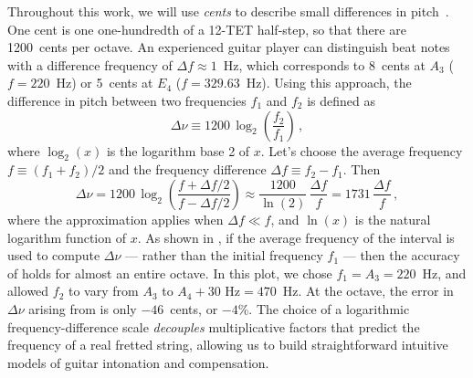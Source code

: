 Throughout this work, we will use \emph{cents} to describe small differences in pitch~\cite{ref:hall1985see,ref:hall1988anl,ref:krantz2000cie,ref:jedrzejewski2008gds,ref:varieschi2010icf,ref:durfee2015pms}. One cent is one one-hundredth of a 12-TET half-step, so that there are 1200~cents per octave. An experienced guitar player can distinguish beat notes with a difference frequency of $\Delta f \approx 1$~Hz, which corresponds to 8~cents at $A_3$ ($f = 220$~Hz) or 5~cents at $E_4$ ($f = 329.63$~Hz). Using this approach, the difference in pitch between two frequencies $f_1$ and $f_2$ is defined as
 \begin{equation} \label{eqn:cents_def}
\Delta \nu \equiv 1200\, \log_2\left(\frac{f_2}{f_1}\right)\, ,
 \end{equation}
where $\log_2(x)$ is the logarithm base 2 of $x$. Let's choose the average frequency $f \equiv (f_1 + f_2) / 2$ and the frequency difference $\Delta f \equiv f_2 - f_1$. Then
 \begin{equation} \label{eqn:cents_approx}
\Delta \nu = 1200\, \log_2\left(\frac{f + \Delta f / 2}{f - \Delta f /2}\right) \approx \frac{1200}{\ln(2)}\, \frac{\Delta f}{f} = 1731\, \frac{\Delta f}{f}\, ,
 \end{equation}
where the approximation applies when $\Delta f \ll f$, and $\ln(x)$ is the natural logarithm function of $x$. As shown in , if the average frequency of the interval is used to compute $\Delta \nu$ --- rather than the initial frequency $f_1$ --- then the accuracy of  holds for almost an entire octave. In this plot, we chose $f_1 = A_3 = 220$~Hz, and allowed $f_2$ to vary from $A_3$ to $A_4 + 30 \textrm{ Hz} = 470$~Hz. At the octave, the error in $\Delta \nu$ arising from  is only $-46$~cents, or $-4$\%. The choice of a logarithmic frequency-difference scale \emph{decouples} multiplicative factors that predict the frequency of a real fretted string, allowing us to build straightforward intuitive models of guitar intonation and compensation.
  
